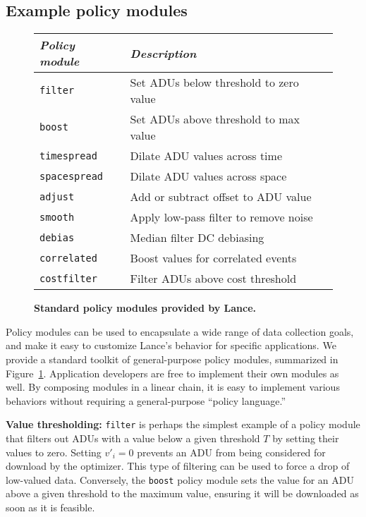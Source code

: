 \subsection{Example policy modules}
\label{sec-example-policies}

\begin{figure}[t]
\begin{center}
\begin{small}
\begin{tabular}{|l|l|} \hline
{\em Policy module} & {\em Description} \\ \hline
{\tt filter} & Set ADUs below threshold to zero value \\
{\tt boost} & Set ADUs above threshold to max value \\
{\tt timespread} & Dilate ADU values across time \\
{\tt spacespread} & Dilate ADU values across space \\
{\tt adjust} & Add or subtract offset to ADU value \\
{\tt smooth} & Apply low-pass filter to remove noise \\
{\tt debias} & Median filter DC debiasing \\
{\tt correlated} & Boost values for correlated events \\
{\tt costfilter} & Filter ADUs above cost threshold \\ \hline
\end{tabular}
\end{small}
\end{center}
\caption{\small {\bf Standard policy modules provided by Lance.}}
\label{fig-policymodules}
\vspace{-0.2in}
\end{figure}

Policy modules can be used to encapsulate a wide range of 
data collection goals, and make it easy to customize Lance's behavior
for specific applications. We provide a standard toolkit of
general-purpose policy modules, summarized in Figure~\ref{fig-policymodules}.
Application developers are free to implement their own modules as well.
By composing modules in a linear chain, it is easy to implement 
various behaviors without requiring a general-purpose ``policy language.'' 

{\bf Value thresholding:}
{\tt filter} is perhaps the simplest example of a policy module that 
filters out ADUs with a value below a given threshold $T$ by
setting their values to zero.
Setting $v'_i = 0$ prevents an ADU from being considered for download by the
optimizer.  This type of filtering can be used to force a drop of low-valued
data. Conversely, the {\tt boost} policy module sets the value for an ADU
above a given threshold to the maximum value, ensuring it will be downloaded
as soon as it is feasible.

